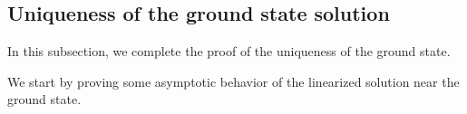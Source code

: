 \documentclass[12pt]{amsart}
\newcommand{\R}{\mathbb R}
\newcommand{\tq}{\tilde q}
\DeclareMathOperator{\spa}{span}
\begin{document}


 \subsection{Uniqueness of the ground state solution}

In this subsection, we complete the proof of the uniqueness of the ground state.

We start by proving some asymptotic behavior of the linearized solution near the ground state. 
\end{document}
